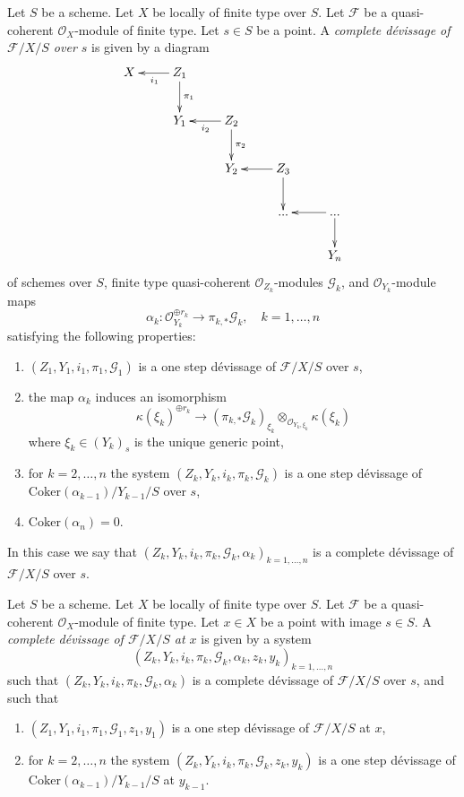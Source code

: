 \begin{definition}
\label{definition-complete-devissage}
Let $S$ be a scheme.
Let $X$ be locally of finite type over $S$.
Let $\mathcal{F}$ be a quasi-coherent $\mathcal{O}_X$-module of finite type.
Let $s \in S$ be a point.
A {\it complete d\'evissage of $\mathcal{F}/X/S$ over $s$} is given by a
diagram
$$
\xymatrix{
X & Z_1 \ar[l]^{i_1} \ar[d]^{\pi_1} \\
& Y_1 & Z_2 \ar[l]^{i_2} \ar[d]^{\pi_2} \\
& & Y_2 & Z_3 \ar[l] \ar[d] \\
& & & ... & ... \ar[l] \ar[d] \\
& & & & Y_n
}
$$
of schemes over $S$, finite type quasi-coherent $\mathcal{O}_{Z_k}$-modules
$\mathcal{G}_k$, and $\mathcal{O}_{Y_k}$-module maps
$$
\alpha_k :
\mathcal{O}_{Y_k}^{\oplus r_k}
\longrightarrow
\pi_{k, *}\mathcal{G}_k,
\quad
k = 1, \ldots, n
$$
satisfying the following properties:
\begin{enumerate}
\item $(Z_1, Y_1, i_1, \pi_1, \mathcal{G}_1)$ is a one step
d\'evissage of $\mathcal{F}/X/S$ over $s$,
\item the map $\alpha_k$ induces an isomorphism
$$
\kappa(\xi_k)^{\oplus r_k} \longrightarrow
(\pi_{k, *}\mathcal{G}_k)_{\xi_k}
\otimes_{\mathcal{O}_{Y_k, \xi_k}} \kappa(\xi_k)
$$
where $\xi_k \in (Y_k)_s$ is the unique generic point,
\item for $k = 2, \ldots, n$ the system
$(Z_k, Y_k, i_k, \pi_k, \mathcal{G}_k)$
is a one step d\'evissage of $\text{Coker}(\alpha_{k - 1})/Y_{k - 1}/S$
over $s$,
\item $\text{Coker}(\alpha_n) = 0$.
\end{enumerate}
In this case we say that
$(Z_k, Y_k, i_k, \pi_k, \mathcal{G}_k, \alpha_k)_{k = 1, \ldots, n}$
is a complete d\'evissage of $\mathcal{F}/X/S$ over $s$.
\end{definition}

\begin{definition}
\label{definition-complete-devissage-at-x}
Let $S$ be a scheme.
Let $X$ be locally of finite type over $S$.
Let $\mathcal{F}$ be a quasi-coherent $\mathcal{O}_X$-module of finite type.
Let $x \in X$ be a point with image $s \in S$.
A {\it complete d\'evissage of $\mathcal{F}/X/S$ at $x$} is given by a
system
$$
(Z_k, Y_k, i_k, \pi_k, \mathcal{G}_k, \alpha_k, z_k, y_k)_{k = 1, \ldots, n}
$$
such that $(Z_k, Y_k, i_k, \pi_k, \mathcal{G}_k, \alpha_k)$ is a
complete d\'evissage of $\mathcal{F}/X/S$ over $s$, and such that
\begin{enumerate}
\item $(Z_1, Y_1, i_1, \pi_1, \mathcal{G}_1, z_1, y_1)$ is a one step
d\'evissage of $\mathcal{F}/X/S$ at $x$,
\item for $k = 2, \ldots, n$ the system
$(Z_k, Y_k, i_k, \pi_k, \mathcal{G}_k, z_k, y_k)$
is a one step d\'evissage of $\text{Coker}(\alpha_{k - 1})/Y_{k - 1}/S$
at $y_{k - 1}$.
\end{enumerate}
\end{definition}


